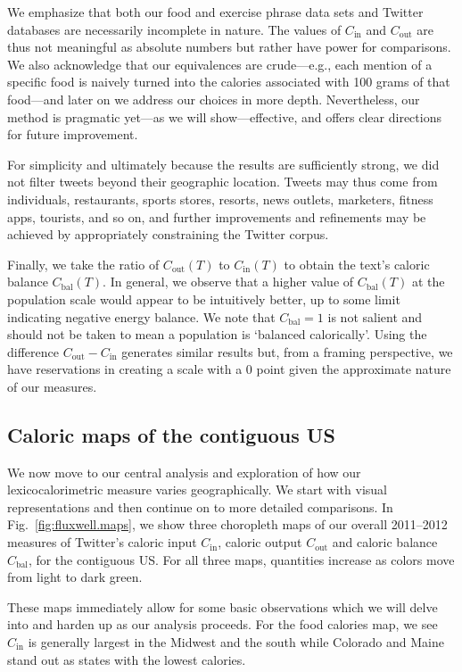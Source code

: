 \documentclass[10pt]{article}
\newcommand{\calin}{C_{\textrm{in}}}
\newcommand{\calout}{C_{\textrm{out}}}
\newcommand{\calbal}{C_{\textrm{bal}}}
\newcommand{\calinfn}[1]{C_{\textrm{in}}(#1)}
\newcommand{\caloutfn}[1]{C_{\textrm{out}}(#1)}
\newcommand{\calbalfn}[1]{C_{\textrm{bal}}(#1)}
\begin{document}
We emphasize that both our food and exercise phrase data sets 
and Twitter databases are necessarily incomplete in nature.
The values of $\calin$ and $\calout$ are thus not meaningful as
absolute numbers but rather have power for comparisons.
We also acknowledge that our equivalences are crude---e.g., each mention
of a specific food is naively turned into the calories associated with 100 grams of
that food---and later on we address our choices in more depth.
Nevertheless, our method is pragmatic yet---as we will
show---effective, and offers clear directions for future improvement.

For simplicity and ultimately because the results are sufficiently
strong, we did not filter tweets beyond their geographic location.
Tweets may thus come from individuals, restaurants, sports stores,
resorts, news outlets, marketers, fitness apps, tourists, and so on,
and further improvements and refinements may be achieved by
appropriately constraining the Twitter corpus.

Finally, we take the ratio of $\caloutfn{T}$ to $\calinfn{T}$
to obtain the text's caloric balance
$\calbalfn{T}$.
In general, we observe that 
a higher value of $\calbalfn{T}$ at the population scale 
would appear to be intuitively better, up to some limit 
indicating negative energy balance.
We note that $\calbal = 1$ is not salient and
should not be taken to mean a population is `balanced calorically'.
Using the difference $\calout - \calin$ generates
similar results but, from a framing perspective,
we have reservations in creating a scale with a 0 point
given the approximate nature of our measures.

\subsection*{Caloric maps of the contiguous US}
\label{subsec:fluxwell.maps}

We now move to our central analysis and exploration of 
how our lexicocalorimetric measure varies geographically.
We start with visual representations
and then continue on to more detailed comparisons.
In Fig.~\ref{fig:fluxwell.maps},
we show three choropleth maps 
of our overall 2011--2012 measures
of Twitter's
caloric input $\calin$,
caloric output $\calout$
and
caloric balance $\calbal$,
for the contiguous US.
For all three maps, quantities increase as colors move from 
light to dark green.

These maps immediately allow for some basic observations
which we will delve into and harden up as our analysis proceeds.
For the food calories map, we see $\calin$
is generally largest in the Midwest and the south
while Colorado and Maine stand out as states with
the lowest calories.
\end{document}
